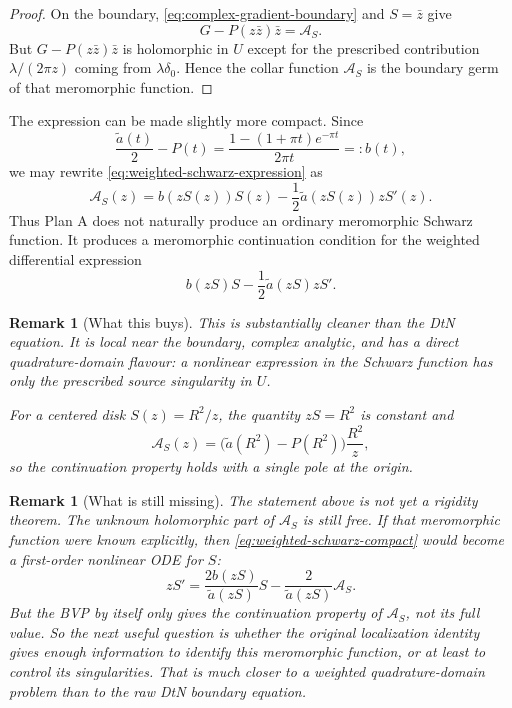 \documentclass[11pt]{article}
\newtheorem{remark}[theorem]{Remark}
\newcommand{\1}{\mathbf 1}
\begin{document}
\begin{proof}
On the boundary, \eqref{eq:complex-gradient-boundary} and \(S=\bar z\) give
\[
  G-P(z\bar z)\bar z
  =
  \mathcal A_S .
\]
But \(G-P(z\bar z)\bar z\) is holomorphic in \(U\) except for the prescribed
contribution \(\lambda/(2\pi z)\) coming from \(\lambda\delta_0\).  Hence the collar
function \(\mathcal A_S\) is the boundary germ of that meromorphic function.
\end{proof}

The expression can be made slightly more compact.  Since
\[
  \frac{\widetilde a(t)}{2}-P(t)
  =
  \frac{1-(1+\pi t)e^{-\pi t}}{2\pi t}
  =:b(t),
\]
we may rewrite \eqref{eq:weighted-schwarz-expression} as
\begin{equation}\label{eq:weighted-schwarz-compact}
  \mathcal A_S(z)
  =
  b(zS(z))S(z)
  -
  \frac12 \widetilde a(zS(z))zS'(z).
\end{equation}
Thus Plan A does not naturally produce an ordinary meromorphic Schwarz function.
It produces a meromorphic continuation condition for the weighted differential
expression
\[
  b(zS)S-\frac12\widetilde a(zS)zS'.
\]

\begin{remark}[What this buys]
This is substantially cleaner than the DtN equation.  It is local near the boundary,
complex analytic, and has a direct quadrature-domain flavour: a nonlinear expression
in the Schwarz function has only the prescribed source singularity in \(U\).

For a centered disk \(S(z)=R^2/z\), the quantity \(zS=R^2\) is constant and
\[
  \mathcal A_S(z)
  =
  \bigl(\widetilde a(R^2)-P(R^2)\bigr)\frac{R^2}{z},
\]
so the continuation property holds with a single pole at the origin.
\end{remark}

\begin{remark}[What is still missing]
The statement above is not yet a rigidity theorem.  The unknown holomorphic part of
\(\mathcal A_S\) is still free.  If that meromorphic function were known explicitly,
then \eqref{eq:weighted-schwarz-compact} would become a first-order nonlinear ODE for
\(S\):
\[
  zS'
  =
  \frac{2b(zS)}{\widetilde a(zS)}S
  -
  \frac{2}{\widetilde a(zS)}\mathcal A_S .
\]
But the BVP by itself only gives the continuation property of \(\mathcal A_S\), not
its full value.  So the next useful question is whether the original localization
identity gives enough information to identify this meromorphic function, or at least
to control its singularities.  That is much closer to a weighted quadrature-domain
problem than to the raw DtN boundary equation.
\end{remark}
\end{document}
